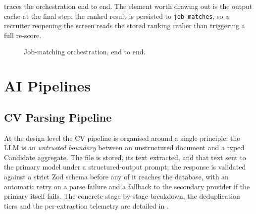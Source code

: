  traces the orchestration end to end. The element
worth drawing out is the output cache at the final step: the ranked result is
persisted to \texttt{job\_matches}, so a recruiter reopening the screen reads the
stored ranking rather than triggering a full re-score.

\begin{figure}[ht]
\centering
{}
\caption[Job-matching orchestration]{Job-matching orchestration, end to end.}
\label{fig:match-flow}
\end{figure}


\section{AI Pipelines}
\label{sec:design-ai}

\subsection{CV Parsing Pipeline}
\label{sec:design-cv}

At the design level the CV pipeline is organised around a single principle:
the LLM is an \emph{untrusted boundary} between an unstructured document and a
typed Candidate aggregate. The file is stored, its text extracted, and that
text sent to the primary model under a structured-output
prompt; the response is validated against a strict Zod schema before any of it
reaches the database, with an automatic retry on a parse failure and a
fallback to the secondary provider if the primary itself fails. The concrete stage-by-stage
breakdown, the deduplication tiers and the per-extraction telemetry are
detailed in .


